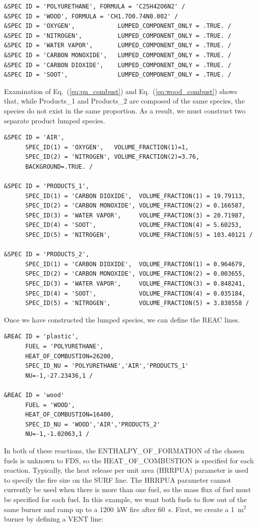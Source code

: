 \documentclass[11pt]{book}
\begin{document}
\begin{lstlisting}
&SPEC ID = 'POLYURETHANE', FORMULA = 'C25H42O6N2' /
&SPEC ID = 'WOOD', FORMULA = 'CH1.7O0.74N0.002' /
&SPEC ID = 'OXYGEN',            LUMPED_COMPONENT_ONLY = .TRUE. /
&SPEC ID = 'NITROGEN',          LUMPED_COMPONENT_ONLY = .TRUE. /
&SPEC ID = 'WATER VAPOR',       LUMPED_COMPONENT_ONLY = .TRUE. /
&SPEC ID = 'CARBON MONOXIDE',   LUMPED_COMPONENT_ONLY = .TRUE. /
&SPEC ID = 'CARBON DIOXIDE',    LUMPED_COMPONENT_ONLY = .TRUE. /
&SPEC ID = 'SOOT',              LUMPED_COMPONENT_ONLY = .TRUE. /
\end{lstlisting}
Examination of Eq.~(\ref{eq:pu_combust}) and Eq.~(\ref{eq:wood_combust}) shows that, while Products\_1 and Products\_2 are composed of the same species, the species do not exist in the same proportion. As a result, we must construct two separate product lumped species.
\begin{lstlisting}
&SPEC ID = 'AIR',
      SPEC_ID(1) = 'OXYGEN',   VOLUME_FRACTION(1)=1,
      SPEC_ID(2) = 'NITROGEN', VOLUME_FRACTION(2)=3.76,
      BACKGROUND=.TRUE. /

&SPEC ID = 'PRODUCTS_1',
      SPEC_ID(1) = 'CARBON DIOXIDE',  VOLUME_FRACTION(1) = 19.79113,
      SPEC_ID(2) = 'CARBON MONOXIDE', VOLUME_FRACTION(2) = 0.166587,
      SPEC_ID(3) = 'WATER VAPOR',     VOLUME_FRACTION(3) = 20.71987,
      SPEC_ID(4) = 'SOOT',            VOLUME_FRACTION(4) = 5.60253,
      SPEC_ID(5) = 'NITROGEN',        VOLUME_FRACTION(5) = 103.40121 /

&SPEC ID = 'PRODUCTS_2',
      SPEC_ID(1) = 'CARBON DIOXIDE',  VOLUME_FRACTION(1) = 0.964679,
      SPEC_ID(2) = 'CARBON MONOXIDE', VOLUME_FRACTION(2) = 0.003655,
      SPEC_ID(3) = 'WATER VAPOR',     VOLUME_FRACTION(3) = 0.848241,
      SPEC_ID(4) = 'SOOT',            VOLUME_FRACTION(4) = 0.035184,
      SPEC_ID(5) = 'NITROGEN',        VOLUME_FRACTION(5) = 3.838558 /
\end{lstlisting}
Once we have constructed the lumped species, we can define the {\ct REAC} lines.
\begin{lstlisting}
&REAC ID = 'plastic',
      FUEL = 'POLYURETHANE',
      HEAT_OF_COMBUSTION=26200,
      SPEC_ID_NU = 'POLYURETHANE','AIR','PRODUCTS_1'
      NU=-1,-27.23436,1 /

&REAC ID = 'wood'
      FUEL = 'WOOD',
      HEAT_OF_COMBUSTION=16400,
      SPEC_ID_NU = 'WOOD','AIR','PRODUCTS_2'
      NU=-1,-1.02063,1 /
\end{lstlisting}
In both of these reactions, the {\ct ENTHALPY\_OF\_FORMATION} of the chosen fuels is unknown to FDS, so the {\ct HEAT\_OF\_COMBUSTION} is specified for each reaction. Typically, the heat release per unit area ({\ct HRRPUA}) parameter is used to specify the fire size on the {\ct SURF} line. The {\ct HRRPUA} parameter cannot currently be used when there is more than one fuel, so the mass flux of fuel must be specified for each fuel. In this example, we want both fuels to flow out of the same burner and ramp up to a 1200~kW fire after 60~s. First, we create a 1~m$^2$ burner by defining a {\ct VENT} line:
\end{document}
